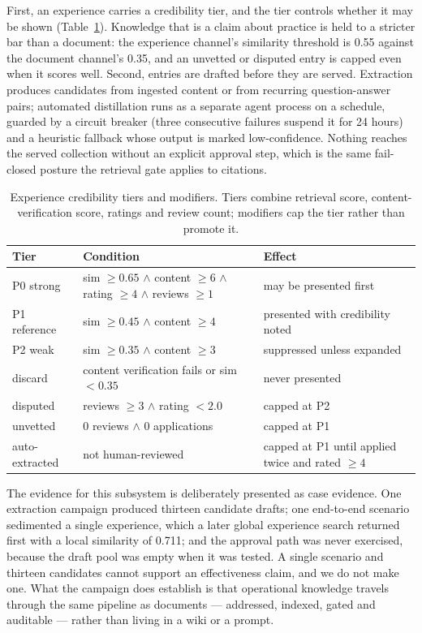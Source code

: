 First, an experience carries a credibility tier, and the tier controls
whether it may be shown (Table~\ref{tab:exp-tiers}). Knowledge that is a
claim about practice is held to a stricter bar than a document: the
experience channel's similarity threshold is 0.55 against the document
channel's 0.35, and an unvetted or disputed entry is capped even when it
scores well. Second, entries are drafted before they are served. Extraction
produces candidates from ingested content or from recurring question-answer
pairs; automated distillation runs as a separate agent process on a schedule,
guarded by a circuit breaker (three consecutive failures suspend it for 24
hours) and a heuristic fallback whose output is marked low-confidence.
Nothing reaches the served collection without an explicit approval step,
which is the same fail-closed posture the retrieval gate applies to
citations.

\begin{table}[t]
\centering
\small
\caption{Experience credibility tiers and modifiers. Tiers combine retrieval
score, content-verification score, ratings and review count; modifiers cap
the tier rather than promote it.}
\label{tab:exp-tiers}
\begin{tabular}{@{}llp{}@{}}
\toprule
Tier & Condition & Effect \\
\midrule
P0 strong & sim $\ge 0.65$ $\wedge$ content $\ge 6$ $\wedge$ rating $\ge 4$ $\wedge$ reviews $\ge 1$ & may be presented first \\
P1 reference & sim $\ge 0.45$ $\wedge$ content $\ge 4$ & presented with credibility noted \\
P2 weak & sim $\ge 0.35$ $\wedge$ content $\ge 3$ & suppressed unless expanded \\
discard & content verification fails or sim $< 0.35$ & never presented \\
\addlinespace
disputed & reviews $\ge 3$ $\wedge$ rating $< 2.0$ & capped at P2 \\
unvetted & 0 reviews $\wedge$ 0 applications & capped at P1 \\
auto-extracted & not human-reviewed & capped at P1 until applied twice and rated $\ge 4$ \\
\bottomrule
\end{tabular}
\end{table}

The evidence for this subsystem is deliberately presented as case evidence.
One extraction campaign produced thirteen candidate drafts; one end-to-end
scenario sedimented a single experience, which a later global experience
search returned first with a local similarity of 0.711; and the approval path
was never exercised, because the draft pool was empty when it was tested. A
single scenario and thirteen candidates cannot support an effectiveness
claim, and we do not make one. What the campaign does establish is that
operational knowledge travels through the same pipeline as documents ---
addressed, indexed, gated and auditable --- rather than living in a wiki or a
prompt.

